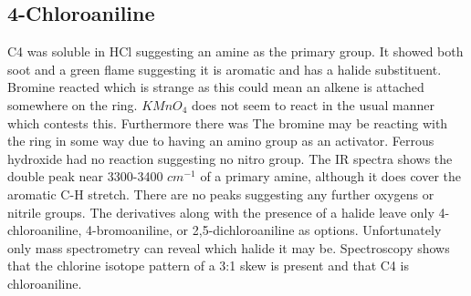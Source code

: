 \documentclass[11pt]{article}
\begin{document}
	\subsection{4-Chloroaniline}
	C4 was soluble in HCl suggesting an amine as the primary group. It showed both soot and a green flame suggesting it is aromatic and has a halide substituent. Bromine reacted which is strange as this could mean an alkene is attached somewhere on the ring. $KMnO_4$ does not seem to react in the usual manner which contests this. Furthermore there was The bromine may be reacting with the ring in some way due to having an amino group as an activator. Ferrous hydroxide had no reaction suggesting no nitro group. The IR spectra shows the double peak near 3300-3400 $cm^{-1}$ of a primary amine, although it does cover the aromatic C-H stretch. There are no peaks suggesting any further oxygens or nitrile groups. The derivatives along with the presence of a halide leave only 4-chloroaniline, 4-bromoaniline, or 2,5-dichloroaniline as options. Unfortunately only mass spectrometry can reveal which halide it may be. Spectroscopy shows that the chlorine isotope pattern of a 3:1 skew is present and that C4 is chloroaniline.
	
\end{document}
